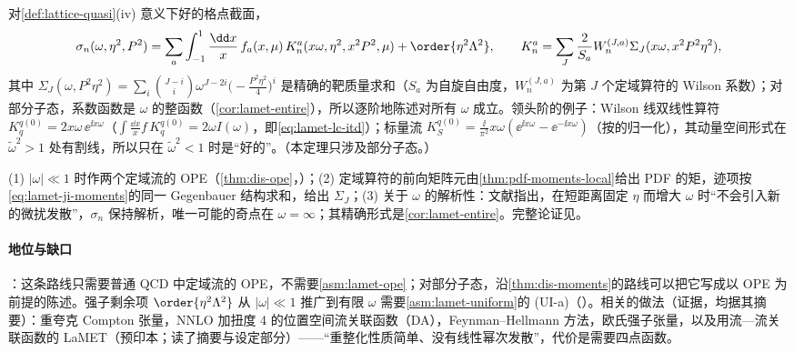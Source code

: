 \begin{theorem}\label{thm:lamet-lcs}
对\cref{def:lattice-quasi}(iv) 意义下好的格点截面，
\begin{equation}\label{eq:lamet-lcs}
\sigma_n(\omega,\eta^2,P^2)=\sum_a\int_{-1}^1\frac{\dd x}x\,f_a(x,\mu)\,K^a_n(x\omega,\eta^2,x^2P^2,\mu)+\order{\eta^2\Lambda^2},\qquad
K^a_n=\sum_J\frac2{S_a}W^{(J,a)}_n\Sigma_J(x\omega,x^2P^2\eta^2),
\end{equation}
其中 $\Sigma_J(\omega,P^2\eta^2)=\sum_i\binom{J-i}i\omega^{J-2i}\big(-\frac{P^2\eta^2}4\big)^i$ 是精确的靶质量求和（$S_a$ 为自旋自由度，$W^{(J,a)}_n$ 为第 $J$ 个定域算符的 Wilson 系数）；对部分子态，系数函数是 $\omega$ 的整函数（\cref{cor:lamet-entire}），所以逐阶地陈述对所有 $\omega$ 成立。领头阶的例子：Wilson 线双线性算符 $K^{q(0)}_q=2x\omega\,\ee^{\ii x\omega}$（$\int\frac{\dd x}x f\,K^{q(0)}_q=2\omega I(\omega)$，即\cref{eq:lamet-lc-itd}）；标量流 $K^{q(0)}_S=\frac{\ii}{\pi^2}x\omega(\ee^{\ii x\omega}-\ee^{-\ii x\omega})$（按\cite{MaQiu2018}的归一化），其动量空间形式在 $\tilde\omega^2>1$ 处有割线，所以只在 $\tilde\omega^2<1$ 时是“好的”。（本定理只涉及部分子态。）
\end{theorem}

\begin{proofsketch}
(1) $|\omega|\ll1$ 时作两个定域流的 OPE（\cref{thm:dis-ope}，\tagA）；(2) 定域算符的前向矩阵元由\cref{thm:pdf-moments-local}给出 PDF 的矩，迹项按\cref{eq:lamet-ji-moments}的同一 Gegenbauer 结构求和，给出 $\Sigma_J$；(3) 关于 $\omega$ 的解析性：文献\cite{MaQiu2018}指出，在短距离固定 $\eta$ 而增大 $\omega$ 时“不会引入新的微扰发散”，$\sigma_n$ 保持解析，唯一可能的奇点在 $\omega=\infty$；其精确形式是\cref{cor:lamet-entire}。完整论证见\cite{MaQiu2018}。
\end{proofsketch}

\paragraph{地位与缺口}
\tagA：这条路线只需要普通 QCD 中定域流的 OPE，不需要\cref{asm:lamet-ope}；对部分子态，沿\cref{thm:dis-moments}的路线可以把它写成以 OPE 为前提的陈述。强子剩余项 $\order{\eta^2\Lambda^2}$ 从 $|\omega|\ll1$ 推广到有限 $\omega$ 需要\cref{asm:lamet-uniform}的 (UI-a)（\tagC）。相关的做法（证据，均据其摘要）：重夸克 Compton 张量\cite{DetmoldLin2006}，NNLO 加扭度 4 的位置空间流关联函数（DA）\cite{Braun:2007wv}，Feynman--Hellmann 方法\cite{ChambersEtAl2017}，欧氏强子张量\cite{Liu:1993cv}，以及用流—流关联函数的 LaMET\cite{Zhang:2026lle}（预印本；读了摘要与设定部分）——“重整化性质简单、没有线性幂次发散”，代价是需要四点函数。

